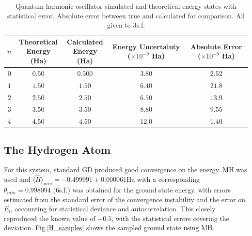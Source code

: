 \documentclass[journal,12pt]{Imperial_lab_report}
\begin{document}
            \begin{table}[h!]
                \centering
                \setlength{\tabcolsep}{5pt}
                \caption{Quantum harmonic oscillator simulated and theoretical energy states with statistical error. Absolute error between true and calculated for comparison.  All given to 3s.f.}
                \label{QHO energies}
                \begin{tabular}{c c c c c}
                    \hline
                    \hline
                    \addlinespace[0.5ex]
                    $n$ & \shortstack{Theoretical \\ Energy (Ha)} & \shortstack{Calculated \\ Energy (Ha)} & \shortstack{Energy \\Uncertainty \\ ($\times 10^{-9}$ Ha)} & \shortstack{Absolute Error \\ ($\times 10^{-9}$ Ha)} \\
                    \hline
                    $0$ & $0.50$ & $0.500$ & $3.80$ & $2.52$ \\
                    $1$ & $1.50$ & $1.50$ & $6.40$  & $21.8$ \\
                    $2$ & $2.50$ & $2.50$ & $6.50$  & $13.9$ \\
                    $3$ & $3.50$ & $3.50$ & $8.80$  & $9.55$ \\
                    $4$ & $4.50$ & $4.50$ & $12.0$  & $1.40$ \\
                    \hline
                    \hline
                \end{tabular}
            \end{table}
            
    \subsection{The Hydrogen Atom}

        For this system, standard GD produced good convergence on the energy. MH was used and $\langle \hat{H} \rangle_{min}=-0.499991 \pm 0.000061$Ha with a corresponding $\theta_{min}=0.998094$ (6s.f.) was obtained for the ground state energy, with errors estimated from the standard error of the convergence instability and the error on $E_l$, accounting for statistical deviance and autocorrelation.  This closely reproduced the known value of $-0.5$, with the statistical errors covering the deviation. Fig.\ref{H_samples} shows the sampled ground state using MH.
    
\end{document}
